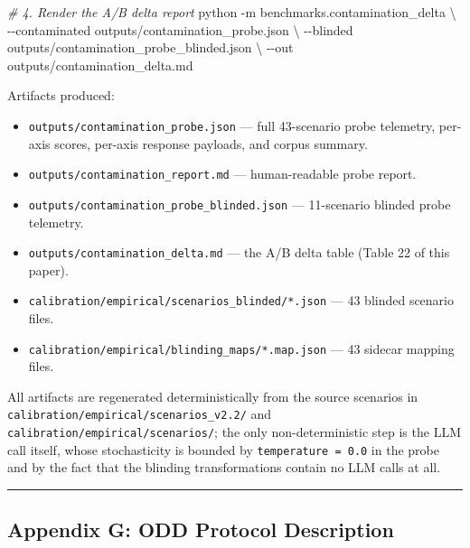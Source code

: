 \documentclass[
]{article}
\newenvironment{Shaded}{}{}
\newcommand{\AttributeTok}[1]{\textcolor[rgb]{0.49,0.56,0.16}{#1}}
\newcommand{\CommentTok}[1]{\textcolor[rgb]{0.38,0.63,0.69}{\textit{#1}}}
\newcommand{\DataTypeTok}[1]{\textcolor[rgb]{0.56,0.13,0.00}{#1}}
\newcommand{\ExtensionTok}[1]{#1}
\newcommand{\NormalTok}[1]{#1}
\providecommand{\tightlist}{%
  \setlength{\itemsep}{0pt}\setlength{\parskip}{0pt}}
\begin{document}
\begin{Shaded}
\begin{Highlighting}[]
\CommentTok{\# 4. Render the A/B delta report}
\ExtensionTok{python} \AttributeTok{{-}m}\NormalTok{ benchmarks.contamination\_delta }\DataTypeTok{\textbackslash{}}
    \AttributeTok{{-}{-}contaminated}\NormalTok{ outputs/contamination\_probe.json }\DataTypeTok{\textbackslash{}}
    \AttributeTok{{-}{-}blinded}\NormalTok{ outputs/contamination\_probe\_blinded.json }\DataTypeTok{\textbackslash{}}
    \AttributeTok{{-}{-}out}\NormalTok{ outputs/contamination\_delta.md}
\end{Highlighting}
\end{Shaded}

Artifacts produced:

\begin{itemize}
\tightlist
\item
  \texttt{outputs/contamination\_probe.json} --- full 43-scenario probe
  telemetry, per-axis scores, per-axis response payloads, and corpus
  summary.
\item
  \texttt{outputs/contamination\_report.md} --- human-readable probe
  report.
\item
  \texttt{outputs/contamination\_probe\_blinded.json} --- 11-scenario
  blinded probe telemetry.
\item
  \texttt{outputs/contamination\_delta.md} --- the A/B delta table
  (Table 22 of this paper).
\item
  \texttt{calibration/empirical/scenarios\_blinded/*.json} --- 43
  blinded scenario files.
\item
  \texttt{calibration/empirical/blinding\_maps/*.map.json} --- 43
  sidecar mapping files.
\end{itemize}

All artifacts are regenerated deterministically from the source
scenarios in \texttt{calibration/empirical/scenarios\_v2.2/} and
\texttt{calibration/empirical/scenarios/}; the only non-deterministic
step is the LLM call itself, whose stochasticity is bounded by
\texttt{temperature\ =\ 0.0} in the probe and by the fact that the
blinding transformations contain no LLM calls at all.

\begin{center}\rule{0.5\linewidth}{0.5pt}\end{center}

\subsection{Appendix G: ODD Protocol
Description}\label{appendix-g-odd-protocol-description}
\end{document}
